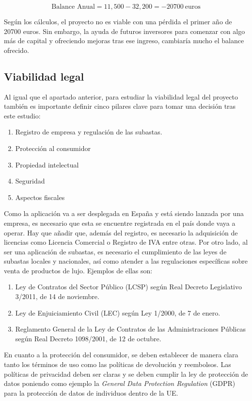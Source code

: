 	\begin{equation}
		\text{Balance\ Anual} = 11,500 - 32,200 = -20700 \ \text{euros}
	\end{equation}
	
	Según los cálculos, el proyecto no es viable con una pérdida el primer año de 20700 euros. Sin embargo, la ayuda de futuros inversores para comenzar con algo más de capital y ofreciendo mejoras tras ese ingreso, cambiaría mucho el balance ofrecido.

\subsection{Viabilidad legal}

	Al igual que el apartado anterior, para estudiar la viabilidad legal del proyecto también es importante definir cinco pilares clave para tomar una decisión tras este estudio:
	\begin{enumerate}
		\item Registro de empresa y regulación de las subastas.
		\item Protección al consumidor
		\item Propiedad intelectual
		\item Seguridad
		\item Aspectos fiscales
	\end{enumerate}
	
	Como la aplicación va a ser desplegada en España y está siendo lanzada por una empresa, es necesario que esta se encuentre registrada en el país donde vaya a operar. Hay que añadir que, además del registro, es necesario la adquisición de licencias como Licencia Comercial o Registro de IVA entre otras. Por otro lado, al ser una aplicación de subastas, es necesario el cumplimiento de las leyes de subastas locales y nacionales, así como atender a las regulaciones específicas sobre venta de productos de lujo. Ejemplos de ellas son:
	\begin{enumerate}
		\item Ley de Contratos del Sector Público (LCSP) según Real Decreto Legislativo 3/2011, de 14 de noviembre.
		\item Ley de Enjuiciamiento Civil (LEC) según Ley 1/2000, de 7 de enero.
		\item Reglamento General de la Ley de Contratos de las Administraciones Públicas según Real Decreto 1098/2001, de 12 de octubre.
	\end{enumerate}
	
	En cuanto a la protección del consumidor, se deben establecer de manera clara tanto los términos de uso como las políticas de devolución y reembolsos. Las políticas de privacidad deben ser claras y se deben cumplir la ley de protección de datos poniendo como ejemplo la \emph{General Data Protection Regulation} (GDPR) para la protección de datos de individuos dentro de la UE.
	
